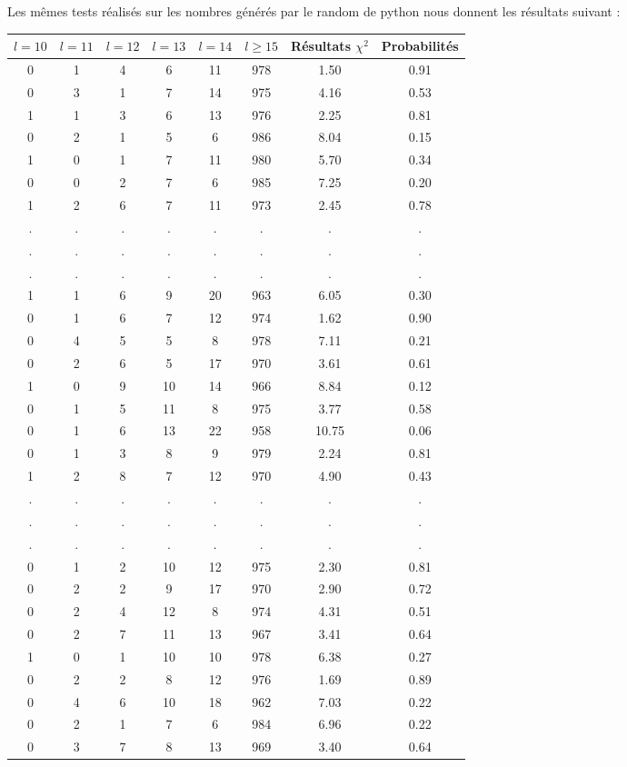 \documentclass[12pt,a4paper]{article}
\begin{document}
Les mêmes tests réalisés sur les nombres générés par le random de python
nous donnent les résultats suivant :


\begin{center}
\begin{tabular}{|c|c|c|c|c|c|c|c|}
\hline
$l = 10$ & $l = 11$ & $l = 12$ & $l = 13$ & $l = 14$ & $l \geq 15$ & Résultats $\chi^2$ & Probabilités \\ \hline
0 & 1 & 4 & 6 & 11 & 978 &  1.50 &  0.91\\ \hline
0 & 3 & 1 & 7 & 14 & 975 &  4.16 &  0.53\\ \hline
1 & 1 & 3 & 6 & 13 & 976 &  2.25 &  0.81\\ \hline
0 & 2 & 1 & 5 & 6 & 986 &  8.04 &  0.15\\ \hline
1 & 0 & 1 & 7 & 11 & 980 &  5.70 &  0.34\\ \hline
0 & 0 & 2 & 7 & 6 & 985 &  7.25 &  0.20\\ \hline
1 & 2 & 6 & 7 & 11 & 973 &  2.45 &  0.78\\ \hline
 . & . & . & . & . & . & . & .\\ \hline
 . & . & . & . & . & . & . & .\\ \hline
 . & . & . & . & . & . & . & .\\ \hline

1 & 1 & 6 & 9 & 20 & 963 &  6.05 &  0.30\\ \hline
0 & 1 & 6 & 7 & 12 & 974 &  1.62 &  0.90\\ \hline
0 & 4 & 5 & 5 & 8 & 978 &  7.11 &  0.21\\ \hline
0 & 2 & 6 & 5 & 17 & 970 &  3.61 &  0.61\\ \hline
1 & 0 & 9 & 10 & 14 & 966 &  8.84 &  0.12\\ \hline
0 & 1 & 5 & 11 & 8 & 975 &  3.77 &  0.58\\ \hline
0 & 1 & 6 & 13 & 22 & 958 & 10.75 &  0.06\\ \hline
0 & 1 & 3 & 8 & 9 & 979 &  2.24 &  0.81\\ \hline
1 & 2 & 8 & 7 & 12 & 970 &  4.90 &  0.43\\ \hline
 . & . & . & . & . & . & . & .\\ \hline
 . & . & . & . & . & . & . & .\\ \hline
 . & . & . & . & . & . & . & .\\ \hline
0 & 1 & 2 & 10 & 12 & 975 &  2.30 &  0.81\\ \hline
0 & 2 & 2 & 9 & 17 & 970 &  2.90 &  0.72\\ \hline
0 & 2 & 4 & 12 & 8 & 974 &  4.31 &  0.51\\ \hline
0 & 2 & 7 & 11 & 13 & 967 &  3.41 &  0.64\\ \hline
1 & 0 & 1 & 10 & 10 & 978 &  6.38 &  0.27\\ \hline
0 & 2 & 2 & 8 & 12 & 976 &  1.69 &  0.89\\ \hline
0 & 4 & 6 & 10 & 18 & 962 &  7.03 &  0.22\\ \hline
0 & 2 & 1 & 7 & 6 & 984 &  6.96 &  0.22\\ \hline
0 & 3 & 7 & 8 & 13 & 969 &  3.40 &  0.64\\ \hline
\end{tabular}
\end{center}
\end{document}

